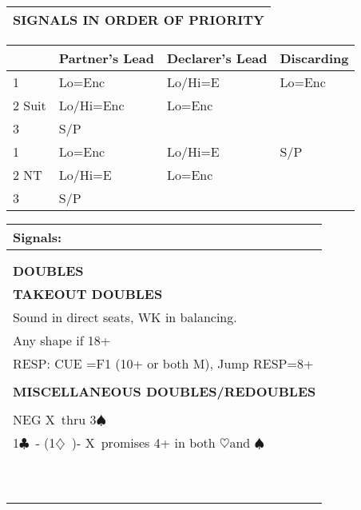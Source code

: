 \documentclass{article}
\newcommand\C{\ensuremath{\clubsuit}}
\newcommand\D{\ensuremath{\diamondsuit}}
\renewcommand\H{\ensuremath{\heartsuit}}
\renewcommand\S{\ensuremath{\spadesuit}}
\newcommand\X{{\footnotesize X}}
\begin{document}
\begin{minipage}{90mm}
\begin{tabular}{| p{88mm} |}
		\textbf{SIGNALS IN ORDER OF PRIORITY} \\ \hline
	\end{tabular}
	\begin{tabular}{| p{8.9mm} | p{22mm} | p{22mm} | p{22mm} |}
		       & Partner's Lead & Declarer's Lead & Discarding \\ \hline
		1      &Lo=Enc          & Lo/Hi=E         & Lo=Enc \\ \hline
		2 Suit &Lo/Hi=Enc       & Lo=Enc          & \\ \hline
		3      &S/P             &                 & \\ \hline
		1      &Lo=Enc          & Lo/Hi=E         & S/P \\ \hline
		2 NT   &Lo/Hi=E         & Lo=Enc          & \\ \hline
		3      &S/P             &                 & \\ \hline
	\end{tabular}
	\begin{tabular}{| p{88mm} |}
		Signals: \\ \hline
		\\ \hline
		\\ \hline \hline
		\cellcolor[gray]{0.9} \textbf{DOUBLES} \\ \hline
		\textbf{TAKEOUT DOUBLES} \\ \hline
                Sound in direct seats, WK in balancing. 
		\\ \hline
                Any shape if 18+
		\\ \hline
                RESP: CUE =F1 (10+ or both M), Jump RESP=8+  
		\\ \hline
		\\ \hline
		\textbf{MISCELLANEOUS DOUBLES/REDOUBLES} \\ \hline
		\\ \hline
                NEG \X\ thru 3\S\
		\\ \hline
                1\C\ - (1\D\ )- \X\ promises 4+ in both \H and \S
		\\ \hline
		\\ \hline
		\\ \hline
		\\ \hline
		\\ \hline
		\\ \hline
		\\ \hline
		\\ \hline
		\\ \hline
		\\ \hline
		\\ \hline
	\end{tabular}
\end{minipage}
\end{document}
